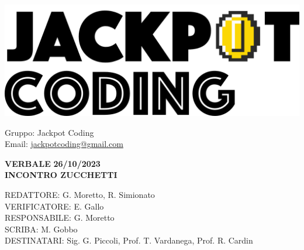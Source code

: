 \documentclass[5pt]{article}
\begin{document}
\begin{minipage}[t]{0.50\textwidth}
    \begin{flushleft}
        \hspace{10pt}
        \includegraphics[scale=0.65]{assets/jackpot-logo.png} 
    \end{flushleft}
\end{minipage}
\hspace{-60pt} %
\begin{flushright}
    \begin{minipage}[t]{0.50\textwidth}
        \begin{flushright}
            Gruppo: {\Large Jackpot Coding}\\
            Email: \href{mailto:jackpotcoding@gmail.com}{jackpotcoding@gmail.com}
        \end{flushright}
    \end{minipage}
\end{flushright}

\vspace{24pt}

\begin{center}
    \textbf{\large VERBALE }
    \textbf{\large 26/10/2023} \\
    \textbf{\LARGE INCONTRO ZUCCHETTI}
\end{center}

\vspace{13pt}

\begin{flushleft}
    \begin{spacing}{1.5}
        REDATTORE:  G. Moretto, R. Simionato\\%
        VERIFICATORE:   E. Gallo\\%
        RESPONSABILE:   G. Moretto\\%
        \vspace{7pt}
        SCRIBA: M. Gobbo\\%
        \vspace{7pt}
        DESTINATARI:   Sig. G. Piccoli, Prof. T. Vardanega, Prof. R. Cardin\\%
    \end{spacing}
\end{flushleft}
\end{document}
